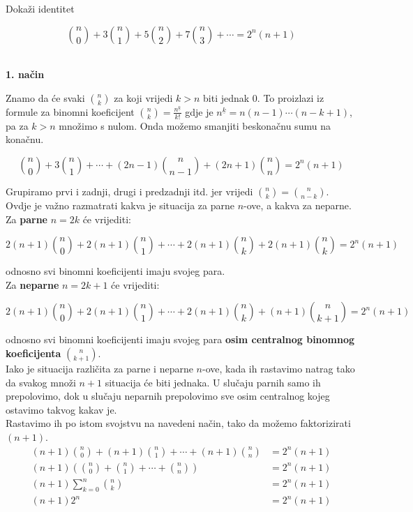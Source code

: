\documentclass[exam.tex]{subfiles}
\begin{document}
	\begin{task}
		Dokaži identitet
	
		\[ \binom{n}{0} + 3 \binom{n}{1} + 5 \binom{n}{2} + 7 \binom{n}{3} + \cdots = 2^n (n + 1) \] \\[1em]
	\end{task}
	
	\textbf{1. način}
	
	Znamo da će svaki \( \displaystyle \binom{n}{k} \) za koji vrijedi \( k > n \) biti jednak 0. To proizlazi iz formule za binomni koeficijent \( \displaystyle \binom{n}{k} = \frac{n^{\underline{k}}}{k!} \) gdje je \( n^{\underline{k}} = n (n - 1) \cdots (n - k + 1) \), pa za \( k > n\) množimo s nulom. Onda možemo smanjiti beskonačnu sumu na konačnu.
	
	\[ \binom{n}{0} + 3 \binom{n}{1} + \cdots + (2n - 1) \binom{n}{n - 1} + (2n + 1) \binom{n}{n} = 2^n (n + 1) \]
	
	Grupiramo prvi i zadnji, drugi i predzadnji itd. jer vrijedi \( \binom{n}{k} = \binom{n}{n - k} \). \\
	
	Ovdje je važno razmatrati kakva je situacija za parne \( n \)-ove, a kakva za neparne. Za \textbf{parne} \( n = 2k \) će vrijediti:
	
	\[ 2(n + 1) \binom{n}{0} + 2(n + 1) \binom{n}{1} + \cdots + 2(n + 1) \binom{n}{k} + 2(n + 1) \binom{n}{k} = 2^n (n + 1) \]
	
	odnosno svi binomni koeficijenti imaju svojeg para. \\
	
	Za \textbf{neparne} \( n = 2k + 1 \) će vrijediti:
	
	\[ 2(n + 1) \binom{n}{0} + 2(n + 1) \binom{n}{1} + \cdots 
	+ 2(n + 1) \binom{n}{k}  + (n + 1) \binom{n}{k + 1} = 2^n (n + 1) \]
	
	odnosno svi binomni koeficijenti imaju svojeg para \textbf{osim centralnog binomnog koeficijenta} \( \binom{n}{k + 1} \). \\
	
	Iako je situacija različita za parne i neparne \( n \)-ove, kada ih rastavimo natrag tako da svakog množi \( n + 1 \) situacija će biti jednaka. U slučaju parnih samo ih prepolovimo, dok u slučaju neparnih prepolovimo sve osim centralnog kojeg ostavimo takvog kakav je. \\
	
	Rastavimo ih po istom svojstvu na navedeni način, tako da možemo faktorizirati \( (n + 1) \).
	\begin{align*}
		(n + 1) \binom{n}{0} + (n + 1) \binom{n}{1} + \cdots + (n + 1) \binom{n}{n} &= 2^n (n + 1) \\
		(n + 1) \left (\binom{n}{0} + \binom{n}{1} + \cdots + \binom{n}{n} \right) &= 2^n (n + 1) \\
		(n + 1) \sum\limits^n_{k=0} \binom{n}{k} &= 2^n (n + 1) \\
		(n + 1) 2^n &= 2^n (n + 1)
	\end{align*}
	
\end{document}
